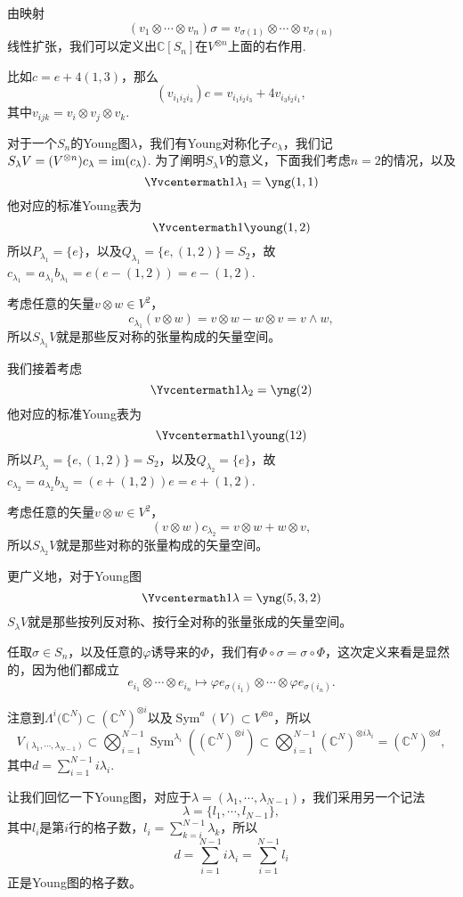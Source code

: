 \documentclass[11pt]{article}
\theoremstyle{definition}
\theoremstyle{plain}
\newcommand{\cc}{\mathbb{C}}
\DeclareMathOperator{\sym}{Sym}
\begin{document}
\para 由映射
\[
	(v_{1}\otimes\cdots\otimes v_{n})\sigma=v_{{\sigma(1)}}\otimes\cdots\otimes v_{{\sigma(n)}}
\]
线性扩张，我们可以定义出$\cc[S_n]$在$V^{\otimes n}$上面的右作用.

比如$c=e+4(1,3)$，那么
\[
	(v_{i_1i_2i_3})c=v_{i_1i_2i_3}+4v_{i_3i_2i_1},
\]
其中$v_{ijk}=v_{i}\otimes v_{j}\otimes v_{k}$.

\para 对于一个$S_n$的Young图$\lambda$，我们有Young对称化子$c_\lambda$，我们记$S_\lambda V= (V^{\otimes n})c_\lambda=\operatorname{im}(c_\lambda)$. 为了阐明$S_\lambda V$的意义，下面我们考虑$n=2$的情况，以及
\[\Yvcentermath1
	\lambda_1=\yng(1,1)
\]
他对应的标准Young表为
\[\Yvcentermath1
	\young(1,2)
\]
所以$P_{\lambda_1}=\{e\}$，以及$Q_{\lambda_1}=\{e,(1,2)\}=S_2$，故$c_{\lambda_1}=a_{\lambda_1} b_{\lambda_1} =e (e- (1,2))=e- (1,2)$.

考虑任意的矢量$v\otimes w\in V^2$，
\[
c_{\lambda_1}(v\otimes w)=v\otimes w-w\otimes v=v\wedge w,
\]
所以$S_{\lambda_1} V$就是那些反对称的张量构成的矢量空间。

我们接着考虑
\[\Yvcentermath1
	\lambda_2=\yng(2)
\]
他对应的标准Young表为
\[\Yvcentermath1
	\young(12)
\]
所以$P_{\lambda_2}=\{e,(1,2)\}=S_2$，以及$Q_{\lambda_2}=\{e\}$，故$c_{\lambda_2}=a_{\lambda_2} b_{\lambda_2} =(e+(1,2))e =e+(1,2)$.

考虑任意的矢量$v\otimes w\in V^2$，
\[
(v\otimes w)c_{\lambda_2}=v\otimes w+w\otimes v,
\]
所以$S_{\lambda_2} V$就是那些对称的张量构成的矢量空间。

更广义地，对于Young图
\[\Yvcentermath1
	\lambda=\yng(5,3,2)
\]
$S_{\lambda} V$就是那些按列反对称、按行全对称的张量张成的矢量空间。

\para 任取$\sigma\in S_n$，以及任意的$\varphi$诱导来的$\Phi$，我们有$\Phi\circ \sigma=\sigma\circ \Phi$，这次定义来看是显然的，因为他们都成立
\[
	e_{i_1}\otimes\cdots\otimes e_{i_n}\mapsto \varphi e_{\sigma(i_1)}\otimes\cdots\otimes \varphi e_{\sigma(i_n)}.
\]

\para 注意到$\Lambda^i\bigl(\cc^N\bigr)\subset (\cc^N)^{\otimes i}$以及$\sym^a(V)\subset V^{\otimes a}$，所以
\[
	V_{(\lambda_1,\cdots,\lambda_{N-1})}\subset \bigotimes_{i=1}^{N-1}\sym^{\lambda_i}\left((\cc^N)^{\otimes i}\right)\subset  \bigotimes_{i=1}^{N-1}(\cc^N)^{\otimes i\lambda_i}=(\cc^N)^{\otimes d},
\]
其中$d=\sum_{i=1}^{N-1}i\lambda_i$. 

让我们回忆一下Young图，对应于$\lambda=(\lambda_1,\cdots, \lambda_{N-1})$，我们采用另一个记法
\[
	\lambda=\{l_1,\cdots,l_{N-1}\},
\]
其中$l_i$是第$i$行的格子数，$l_i=\sum_{k=i}^{N-1}\lambda_k$，所以
\[
	d=\sum_{i=1}^{N-1}i\lambda_i=\sum_{i=1}^{N-1}l_i
\]
正是Young图的格子数。
\end{document}
